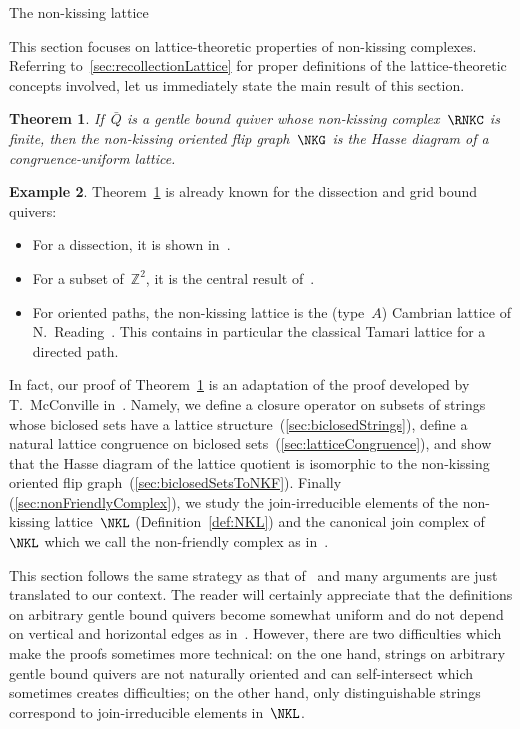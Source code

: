 \documentclass{amsart}
\makeatletter
\newtheorem{theorem}{Theorem}[part]
\theoremstyle{definition}
\newtheorem{example}[theorem]{Example}
\newcommand{\Z}{\mathbb{Z}} %
\def\part{\@startsection{part}{1}%
\z@{.7\linespacing\@plus\linespacing}{.8\linespacing}%
{\LARGE\sffamily\centering}}
\makeatother
\begin{document}

\clearpage
\part{The non-kissing lattice}
\label{part:lattice}

This section focuses on lattice-theoretic properties of non-kissing complexes.
Referring to~\ref{sec:recollectionLattice} for proper definitions of the lattice-theoretic concepts involved, let us immediately state the main result of this section.

\begin{theorem}
\label{thm:lattice}
If~$\bar Q$ is a gentle bound quiver whose non-kissing complex~$\RNKC$ is finite, then the non-kissing oriented flip graph~$\NKG$ is the Hasse diagram of a congruence-uniform lattice.
\end{theorem}

\begin{example}
Theorem~\ref{thm:lattice} is already known for the dissection and grid bound quivers:
\begin{itemize}
\item For a dissection, it is shown in~\cite{GarverMcConville}.
\item For a subset of~$\Z^2$,  it is the central result of~\cite{McConville}.
\item For oriented paths, the non-kissing lattice is the (type~$A$) Cambrian lattice of N.~Reading~\cite{Reading-CambrianLattices}. This contains in particular the classical Tamari lattice for a directed path.
\end{itemize}
\end{example}

In fact, our proof of Theorem~\ref{thm:lattice} is an adaptation of the proof  developed by T.~McConville in~\cite{McConville}.
Namely, we define a closure operator on subsets of strings whose biclosed sets have a lattice structure~(\ref{sec:biclosedStrings}), define a natural lattice congruence on biclosed sets~(\ref{sec:latticeCongruence}), and show that the Hasse diagram of the lattice quotient is isomorphic to the non-kissing oriented flip graph~(\ref{sec:biclosedSetsToNKF}).
Finally (\ref{sec:nonFriendlyComplex}), we study the join-irreducible elements of the non-kissing lattice~$\NKL$ (Definition~\ref{def:NKL}) and the canonical join complex of~$\NKL$ which we call the non-friendly complex as in~\cite{GarverMcConville-grid}.

This section follows the same strategy as that of~\cite{McConville, GarverMcConville-grid} and many arguments are just translated to our context.
The reader will certainly appreciate that the definitions on arbitrary gentle bound quivers become somewhat uniform and do not depend on vertical and horizontal edges as in~\cite{McConville}.
However, there are two difficulties which make the proofs sometimes more technical: on the one hand, strings on arbitrary gentle bound quivers are not naturally oriented and can self-intersect which sometimes creates difficulties; on the other hand, only distinguishable strings correspond to join-irreducible elements in~$\NKL$.
\end{document}
